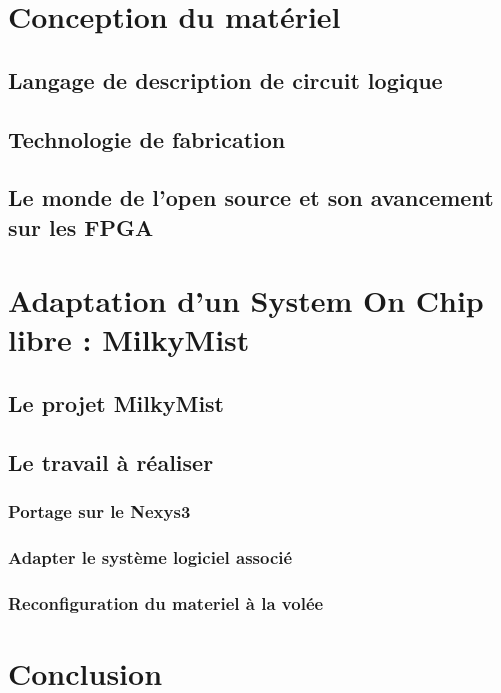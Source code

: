 \documentclass{report}
\begin{document}
\chapter{Conception du matériel}

\section{Langage de description de circuit logique}
    
    \newpage

\section{Technologie de fabrication}
    

\section{Le monde de l'open source et son avancement sur les FPGA}
    
    \newpage

\chapter{Adaptation d'un System On Chip libre : MilkyMist}
\newpage

\section{Le projet MilkyMist}
    
    \newpage

\section{Le travail à réaliser}

\subsection{Portage sur le Nexys3}
    
    \newpage

\subsection{Adapter le système logiciel associé}
    
    \newpage

\subsection{Reconfiguration du materiel à la volée}
    
    \newpage

\chapter*{Conclusion}
    

\newpage



\nocite{*}



\end{document}
